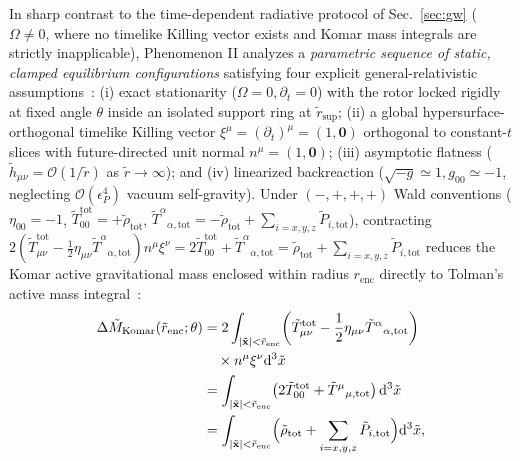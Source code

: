 \documentclass[aps,prd,twocolumn,10pt,showkeys,nofootinbib,floatfix,longbibliography]{revtex4-2}
\newcommand{\dd}{\mathrm{d}}
\begin{document}
In sharp contrast to the time-dependent radiative protocol of Sec.~\ref{sec:gw} ($\Omega \neq 0$, where no timelike Killing vector exists and Komar mass integrals are strictly inapplicable), Phenomenon II analyzes a \emph{parametric sequence of static, clamped equilibrium configurations} satisfying four explicit general-relativistic assumptions~\cite{tolman1930,komar1959,wald1984,sorge2021buoyancy}: (i) exact stationarity ($\Omega = 0, \partial_t = 0$) with the rotor locked rigidly at fixed angle $\theta$ inside an isolated support ring at $\tilde{r}_{\mathrm{sup}}$; (ii) a global hypersurface-orthogonal timelike Killing vector $\xi^\mu = (\partial_t)^\mu = (1,\mathbf{0})$ orthogonal to constant-$t$ slices with future-directed unit normal $n^\mu = (1,\mathbf{0})$; (iii) asymptotic flatness ($\tilde{h}_{\mu\nu} = \mathcal{O}(1/\tilde{r})$ as $\tilde{r} \to \infty$); and (iv) linearized backreaction ($\sqrt{-g} \simeq 1, g_{00} \simeq -1$, neglecting $\mathcal{O}(\epsilon_P^4)$ vacuum self-gravity). Under $(-,+,+,+)$ Wald conventions ($\eta_{00} = -1$, $\tilde{T}_{00}^{\mathrm{tot}} = +\tilde{\rho}_{\mathrm{tot}}$, $\tilde{T}^\alpha{}_{\alpha,\mathrm{tot}} = -\tilde{\rho}_{\mathrm{tot}} + \sum_{i=x,y,z}\tilde{P}_{i,\mathrm{tot}}$), contracting $2(\tilde{T}_{\mu\nu}^{\mathrm{tot}} - \frac{1}{2}\eta_{\mu\nu}\tilde{T}^\alpha{}_{\alpha,\mathrm{tot}})n^\mu\xi^\nu = 2\tilde{T}_{00}^{\mathrm{tot}} + \tilde{T}^\alpha{}_{\alpha,\mathrm{tot}} = \tilde{\rho}_{\mathrm{tot}} + \sum_{i=x,y,z}\tilde{P}_{i,\mathrm{tot}}$ reduces the Komar active gravitational mass enclosed within radius $r_{\mathrm{enc}}$ directly to Tolman's active mass integral~\cite{tolman1930,komar1959,misner1973,wald1984,sorge2021buoyancy}:
\begin{align}
\Delta\tilde{M}_{\mathrm{Komar}}(\tilde{r}_{\mathrm{enc}}; \theta) &= 2 \int_{|\tilde{\mathbf{x}}| < \tilde{r}_{\mathrm{enc}}} \!\left(\tilde{T}_{\mu\nu}^{\mathrm{tot}} - \frac{1}{2}\eta_{\mu\nu}\tilde{T}^\alpha{}_{\alpha,\mathrm{tot}}\right) \nonumber\\
&\quad \times n^\mu \xi^\nu \dd^3\tilde{x} \nonumber\\
&= \int_{|\tilde{\mathbf{x}}| < \tilde{r}_{\mathrm{enc}}} \bigl(2\tilde{T}_{00}^{\mathrm{tot}} + \tilde{T}^\mu{}_{\mu,\mathrm{tot}}\bigr)\,\dd^3\tilde{x} \nonumber\\
&= \int_{|\tilde{\mathbf{x}}| < \tilde{r}_{\mathrm{enc}}} \Bigl(\tilde{\rho}_{\mathrm{tot}} + \sum_{i=x,y,z} \tilde{P}_{i,\mathrm{tot}}\Bigr)\dd^3\tilde{x},
\label{eq:komar_mass}
\end{align}
\end{document}
